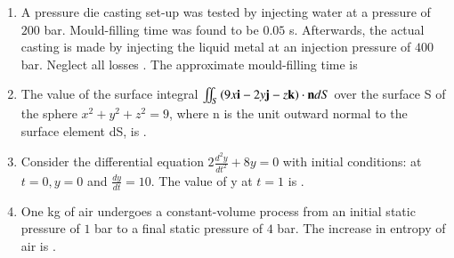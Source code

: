 \documentclass[journal,12pt,onecolumn]{IEEEtran}
\theoremstyle{remark}
\begin{document}
\begin{enumerate}
\hfill{}

\begin{enumerate}
\end{enumerate}

\item A pressure die casting set-up was tested by injecting water  at a pressure of $200$ bar. Mould-filling time was found to be $0.05$ s. Afterwards, the actual casting is made by injecting the liquid metal  at an injection pressure of $400$ bar. Neglect all losses . The approximate mould-filling time   is

\hfill{}

\begin{enumerate}
\end{enumerate}

\item The value of the surface integral $\iint_S \left(9x\mathbf{i} - 2y\mathbf{j} - z\mathbf{k}\right) \cdot \mathbf{n} dS$ over the surface S of the sphere $x^2 + y^2 + z^2 = 9$, where n is the unit outward normal to the surface element dS, is \underline{\hspace{2cm}}.

\hfill{}

\item Consider the differential equation $2\frac{d^2y}{dt^2} + 8y = 0$ with initial conditions: at $t=0, y=0$ and $\frac{dy}{dt}=10$. The value of y  at $t=1$ is \underline{\hspace{2cm}}.

\hfill{}

\item One kg of air undergoes a constant-volume process from an initial static pressure of $1$ bar to a final static pressure of $4$ bar. The increase in entropy of air is \underline{\hspace{2cm}}.


\end{enumerate}
\end{document}
